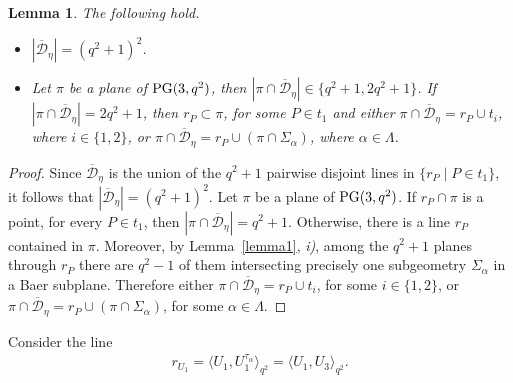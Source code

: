 \documentclass[11pt]{article}
\newtheorem{lemma}[theorem]{Lemma}
\theoremstyle{definition}
\numberwithin{equation}{section}
\def\cD{\mathcal D}
\def\PG{{\rm PG}}
\begin{document}
\begin{lemma}\label{lemma2}
The following hold.
\begin{itemize}
\item[i)] $|\overline{\cD}_{\eta}| = (q^2+1)^2$.
\item[ii)] Let $\pi$ be a plane of $\PG(3, q^2)$, then $|\pi \cap \overline{\cD}_{\eta}| \in \{q^2+1, 2q^2+1\}$. If $|\pi \cap \overline{\cD}_{\eta}| = 2q^2+1$, then $r_P \subset \pi$, for some $P \in t_1$ and either $\pi \cap \overline{\cD}_{\eta} = r_{P} \cup t_i$, where $i \in \{1,2\}$, or $\pi \cap \overline{\cD}_{\eta} = r_P \cup \left( \pi \cap \Sigma_{\alpha} \right)$, where $\alpha \in \Lambda$. 
\end{itemize}
\end{lemma}
\begin{proof}
Since $\overline{\cD}_{\eta}$ is the union of the $q^2+1$ pairwise disjoint lines in $\{r_{P} \mid P \in t_1\}$, it follows that $|\overline{\cD}_{\eta}| = (q^2+1)^2$. Let $\pi$ be a plane of $\PG(3,q^2)$. If $r_P \cap \pi$ is a point, for every $P \in t_1$, then $|\pi \cap \overline{\cD}_{\eta}| = q^2+1$. Otherwise, there is a line $r_P$ contained in $\pi$. Moreover, by Lemma~\ref{lemma1}, {\em i)}, among the $q^2+1$ planes through $r_P$ there are $q^2-1$ of them intersecting precisely one subgeometry $\Sigma_{\alpha}$ in a Baer subplane. Therefore either $\pi \cap \overline{\cD}_{\eta} = r_P \cup t_i$, for some $i \in \{1, 2\}$, or $\pi \cap \overline{\cD}_{\eta} = r_P \cup \left( \pi \cap \Sigma_{\alpha} \right)$, for some $\alpha \in \Lambda$. 
\end{proof}

Consider the line 
\begin{align*}
r_{U_1} = \langle U_1, U_1^{\tau_{\alpha}} \rangle_{q^2} = \langle U_1, U_3 \rangle_{q^2}.
\end{align*}
\end{document}
